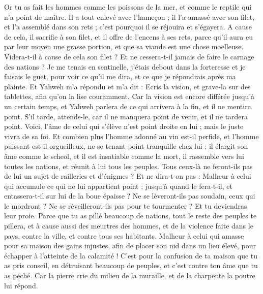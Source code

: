 \begin{multicols}{2}
Or tu as fait les hommes comme les poissons de la mer, et comme le reptile qui n'a point de maître.
Il a tout enlevé avec l'hameçon ; il l'a amassé avec son filet, et l'a assemblé dans son rets ; c'est pourquoi il se réjouira et s'égayera.
A cause de cela, il sacrifie à son filet, et il offre de l’encens à ses rets, parce qu'il aura eu par leur moyen une grasse portion, et que sa viande est une chose moelleuse.
Videra-t-il à cause de cela son filet ? Et ne cessera-t-il jamais de faire le carnage des nations ?
\VerseOne{}Je me tenais en sentinelle, j'étais debout dans la forteresse et je faisais le guet, pour voir ce qu’il me dira, et ce que je répondrais après ma plainte.
Et Yahweh m'a répondu et m'a dit : Ecris la vision, et grave-la sur des tablettes, afin qu'on la lise couramment.
Car la vision est encore différée jusqu'à un certain temps, et Yahweh parlera de ce qui arrivera à la fin, et il ne mentira point. S'il tarde, attends-le, car il ne manquera point de venir, et il ne tardera point.
Voici, l'âme de celui qui s'élève n'est point droite en lui ; mais le juste vivra de sa foi.
Et combien plus l'homme adonné au vin est-il perfide, et l'homme puissant est-il orgueilleux, ne se tenant point tranquille chez lui ; il élargit son âme comme le scheol, et il est insatiable comme la mort, il rassemble vers lui toutes les nations, et réunit à lui tous les peuples.
Tous ceux-là ne feront-ils pas de lui un sujet de railleries et d’énigmes ? Et ne dira-t-on pas : Malheur à celui qui accumule ce qui ne lui appartient point ; jusqu'à quand le fera-t-il, et entassera-t-il sur lui de la boue épaisse ?
Ne se lèveront-ils pas soudain, ceux qui le mordront ? Ne se réveilleront-ils pas pour te tourmenter ? Et tu deviendras leur proie.
Parce que tu as pillé beaucoup de nations, tout le reste des peuples te pillera, et à cause aussi des meurtres des hommes, et de la violence faite dans le pays, contre la ville, et contre tous ses habitants.
Malheur à celui qui amasse pour sa maison des gains injustes, afin de placer son nid dans un lieu élevé, pour échapper à l’atteinte de la calamité !
C’est pour la confusion de ta maison que tu as pris conseil, en détruisant beaucoup de peuples, et c’est contre ton âme que tu as péché.
Car la pierre crie du milieu de la muraille, et de la charpente la poutre lui répond.

\end{multicols}
